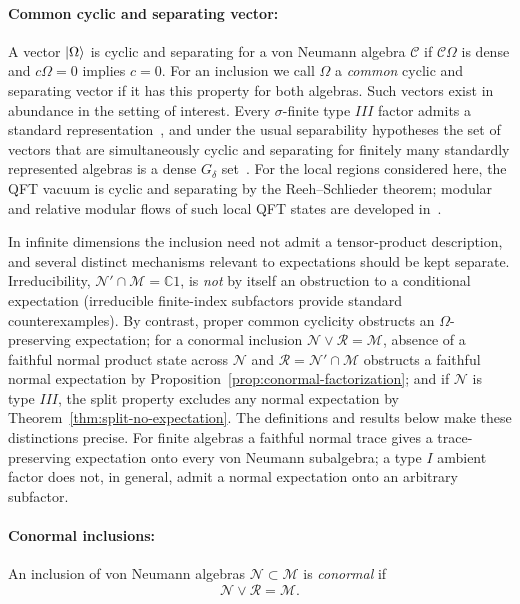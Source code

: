 \documentclass[a4paper,11pt]{article}
\theoremstyle{definition}
\newcommand{\mR}{\mathcal{R}}
\newcommand{\mN}{\mathcal{N}}
\newcommand{\mM}{\mathcal{M}}
\begin{document}
\paragraph{Common cyclic and separating vector:} A vector $\ket\Omega$ is cyclic and separating for a von Neumann algebra $\mathcal C$
if $\mathcal C\Omega$ is dense and $c\Omega=0$ implies $c=0$. For an inclusion we
call $\Omega$ a \emph{common} cyclic and separating vector if it has this property
for both algebras. Such vectors exist in abundance in the setting of interest. Every $\sigma$-finite type $III$ factor admits a standard representation~\cite{Blackadar2006}, and under the usual separability hypotheses the set of vectors that are simultaneously cyclic and separating for finitely many standardly represented algebras is a dense $G_\delta$ set~\cite{dixmiermarechal}. For the local regions considered here, the QFT vacuum is cyclic and separating by the Reeh--Schlieder theorem; modular and relative modular flows of such local QFT states are developed in~\cite{LashkariLiuRajagopal2021,Lashkari2021ModularZeroModes}.

In infinite dimensions the inclusion need not admit a tensor-product description, and several distinct mechanisms relevant to expectations should be kept separate. Irreducibility, $\mN'\cap\mM=\mathbb C1$, is \emph{not} by itself an obstruction to a conditional expectation (irreducible finite-index subfactors provide standard counterexamples). By contrast, proper common cyclicity obstructs an $\Omega$-preserving expectation; for a conormal inclusion $\mN\vee\mR=\mM$, absence of a faithful normal product state across $\mN$ and $\mR=\mN'\cap\mM$ obstructs a faithful normal expectation by Proposition~\ref{prop:conormal-factorization}; and if $\mN$ is type $III$, the split property excludes any normal expectation by Theorem~\ref{thm:split-no-expectation}. The definitions and results below make these distinctions precise. For finite algebras a faithful normal trace gives a trace-preserving expectation onto every von Neumann subalgebra; a type $I$ ambient factor does not, in general, admit a normal expectation onto an arbitrary subfactor.

\paragraph{Conormal inclusions:} An inclusion of von Neumann algebras $\mN\subset \mM$ is \emph{conormal} if
\begin{equation}
 \mN\vee\mR=\mM.
\end{equation}
\end{document}
